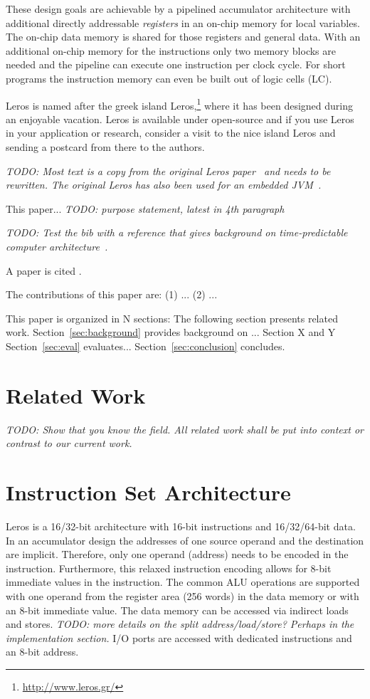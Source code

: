 \documentclass[a4paper,fontsize=10pt,twoside,DIV15,BCOR12mm,headinclude=true,footinclude=false,pagesize,bibtotoc]{scrbook}
\newcommand{\todo}[1]{{\emph{TODO: #1}}}
\begin{document}
These design goals are achievable by a pipelined accumulator architecture with
additional directly addressable \emph{registers} in an on-chip memory for local variables.
The on-chip data memory is shared for those registers and general data.
With an additional on-chip memory for the instructions only two memory blocks are
needed and the pipeline can execute one instruction per clock cycle.
For short programs the instruction memory can even be built out of logic cells (LC).

Leros is named after the greek island Leros,\footnote{\url{http://www.leros.gr/}}
where it has been designed during an enjoyable vacation. Leros is available
under open-source and if you use Leros in your application or research,
consider a visit to the nice island Leros and sending a postcard from there to the authors.

\todo{Most text is a copy from the original Leros paper~\cite{leros:fpl2011} and needs
to be rewritten. The original Leros has also been used for an embedded JVM~\cite{leros:jvm}.}

This paper... \todo{purpose statement, latest in 4th paragraph}

\todo{Test the bib with a reference that gives background on time-predictable
computer architecture~\cite{tpca:jes}.}

A paper is cited \cite{paper:example}.

The contributions of this paper are: (1) ... (2) ...

This paper is organized in N sections: The following section presents related work.
Section~\ref{sec:background} provides background on ...
Section X and Y 
Section~\ref{sec:eval} evaluates...
Section~\ref{sec:conclusion} concludes.

\chapter{Related Work}
\label{sec:related}

\todo{Show that you know the field. All related work shall be put
into context or contrast to our current work.}



\chapter{Instruction Set Architecture}
 
 Leros is a 16/32-bit architecture with 16-bit instructions and 16/32/64-bit data.
 In an accumulator design the addresses of one source operand and the destination are implicit.
 Therefore, only one operand (address) needs to be encoded in the instruction.
 Furthermore, this relaxed instruction encoding allows for 8-bit immediate values in the instruction.
 The common ALU operations are supported with one operand from the register area (256 words)
 in the data memory or with an 8-bit immediate value.
 The data memory can be accessed via indirect loads and stores.
 \todo{more details on the split address/load/store? Perhaps in the implementation section.} I/O ports are accessed with dedicated instructions and an 8-bit address.
  
\end{document}
